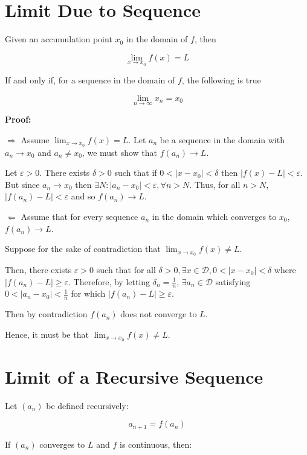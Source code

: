 \section{Limit Due to Sequence}

Given an accumulation point \(x_0\) in the domain of \(f\), then 

\[
    \lim_{x \to x_0} f(x) = L
\]

If and only if, for a sequence in the domain of \(f\), the following is true

\[
    \lim_{n \to \infty} x_n = x_0
\]

\textbf{Proof:}

\(\Rightarrow\) Assume \(\lim_{x \to x_0}f(x) = L\). Let \(a_n\) be a sequence in the domain with \(a_n \to x_0\) and 
\(a_n \ne x_0\), we must show that \(f(a_n) \to L\).

Let \(\varepsilon > 0\). There exists \(\delta > 0\) such that if \(0 < |x - x_0| < \delta\) then 
\(|f(x) - L| < \varepsilon\). But since \(a_n \to x_0\) then \(\exists N: |a_n - x_0| < \varepsilon, \forall n > N \). Thus, 
for all \(n > N\), \(|f(a_n) - L| < \varepsilon\) and so \(f(a_n) \to L\). 

\(\Leftarrow\) Assume that for every sequence \(a_n\) in the domain which converges to \(x_0\),
\(f(a_n) \to L\).

Suppose for the sake of contradiction that \(\lim_{x \to x_0}f(x) \ne L\).

Then, there exists \(\varepsilon > 0\) such that for all \(\delta > 0, \exists x \in \mathcal{D}, 0 < |x - x_0| < \delta\)
where \(|f(a_n) - L| \ge \varepsilon\). Therefore, by letting \(\delta_n = \frac{1}{n}\), \(\exists a_n \in \mathcal{D}\) satisfying 
\(0 < |a_n - x_0| < \frac{1}{n}\) for which \(|f(a_n)- L| \ge \varepsilon\). 

Then by contradiction \(f(a_n)\) does not converge to \(L\). 

Hence, it must be that \(\lim_{x \to x_0}f(x) \ne L\).

\QED

\section{Limit of a Recursive Sequence}

Let \((a_n)\) be defined recursively:

\[
    a_{n+1} = f(a_n)
\]

If \((a_n)\) converges to \(L\) and \(f\) is continuous, then:


